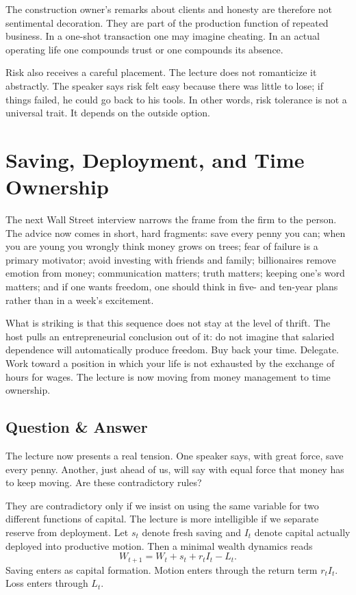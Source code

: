 The construction owner's remarks about clients and honesty are therefore not sentimental decoration. They are part of the production function of repeated business. In a one-shot transaction one may imagine cheating. In an actual operating life one compounds trust or one compounds its absence.

Risk also receives a careful placement. The lecture does not romanticize it abstractly. The speaker says risk felt easy because there was little to lose; if things failed, he could go back to his tools. In other words, risk tolerance is not a universal trait. It depends on the outside option.

\section{Saving, Deployment, and Time Ownership}

The next Wall Street interview narrows the frame from the firm to the person. The advice now comes in short, hard fragments: save every penny you can; when you are young you wrongly think money grows on trees; fear of failure is a primary motivator; avoid investing with friends and family; billionaires remove emotion from money; communication matters; truth matters; keeping one's word matters; and if one wants freedom, one should think in five- and ten-year plans rather than in a week's excitement.

What is striking is that this sequence does not stay at the level of thrift. The host pulls an entrepreneurial conclusion out of it: do not imagine that salaried dependence will automatically produce freedom. Buy back your time. Delegate. Work toward a position in which your life is not exhausted by the exchange of hours for wages. The lecture is now moving from money management to time ownership.

\subsection{Question \& Answer}

The lecture now presents a real tension. One speaker says, with great force, save every penny. Another, just ahead of us, will say with equal force that money has to keep moving. Are these contradictory rules?

They are contradictory only if we insist on using the same variable for two different functions of capital. The lecture is more intelligible if we separate reserve from deployment. Let \(s_t\) denote fresh saving and \(I_t\) denote capital actually deployed into productive motion. Then a minimal wealth dynamics reads
\begin{equation}
W_{t+1}=W_t+s_t+r_t I_t-L_t.
\end{equation}
Saving enters as capital formation. Motion enters through the return term \(r_t I_t\). Loss enters through \(L_t\).

